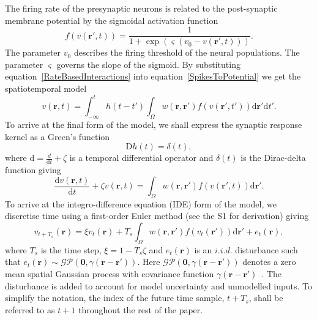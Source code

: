 \documentclass[12pt]{iopart}
\begin{document}
The firing rate of the presynaptic neurons is related to the post-synaptic membrane potential by the sigmoidal activation function 
\begin{equation}
	\label{ActivationFunction} f\left( v\left( \mathbf{r}', t \right) \right) = \frac{1}{1 + \exp \left( \varsigma \left( v_0 - v\left(\mathbf{r}',t\right) \right) \right)}. 
\end{equation}
The parameter $v_0$ describes the  firing threshold of the neural populations. The parameter $\varsigma$ governs the slope of the sigmoid. By substituting equation~\ref{RateBasedInteractions} into equation~\ref{SpikesToPotential} we get the spatiotemporal model 
\begin{equation}
	\label{FullDoubleIntModel} v\left(\mathbf{r},t\right) =
	\int_{-\infty}^t 
	h\left(t - t'\right) \int_\Omega
	w\left(\mathbf{r},\mathbf{r}'\right) 
	f\left( v\left( \mathbf{r}',t' \right)\right)
	\textrm{d}\mathbf{r}'\textrm{d}t'.
\end{equation}
To arrive at the final form of the model, we shall express the synaptic response kernel as a Green's function 
\begin{equation}
	\label{GreensFuncDef} \textrm{D}h\left( t \right) = \delta \left( t \right), 
\end{equation}
where $\textrm{d}=\frac{d}{\textrm{d}t} + \zeta$ is a temporal differential operator and $\delta(t)$ is the Dirac-delta function giving 
\begin{equation}
	\label{FinalFormContinuous} 
	\frac{\textrm{d}v\left( \mathbf{r},t \right)}{\textrm{d}t} + \zeta v\left( \mathbf{r},t \right) = \int_\Omega {w\left( \mathbf{r},\mathbf{r}' \right)f\left( {v\left( \mathbf{r}',t \right)} \right)\textrm{d}\mathbf{r}'}. 
\end{equation}
To arrive at the integro-difference equation (IDE) form of the model, we discretise time using a first-order Euler method (see the S1 for derivation) giving 
\begin{equation}
	\label{DiscreteTimeModel} 
	v_{t+T_s}\left(\mathbf{r}\right) = 
	\xi v_t\left(\mathbf{r}\right) + 
	T_s \int_\Omega { 
	    w\left(\mathbf{r},\mathbf{r}'\right)
	    f\left(v_t\left(\mathbf{r}'\right)\right) 
	\textrm{d}\mathbf{r}'} 
	+ e_t\left(\mathbf{r}\right), 
\end{equation}
where $T_s$ is the time step, $\xi = 1-T_s\zeta $ and $e_t(\mathbf{r})$ is an $i.i.d.$ disturbance such that $e_t(\mathbf{r})\sim\mathcal{GP}(\mathbf 0,\gamma(\mathbf{r}-\mathbf{r}'))$. Here $\mathcal{GP}(\mathbf 0,\gamma(\mathbf{r}-\mathbf{r}'))$ denotes a zero mean spatial Gaussian process with covariance function $\gamma(\mathbf{r}-\mathbf{r}')$~\cite{Rasmussen2005}. The disturbance is added to account for model uncertainty and unmodelled inputs. To simplify the notation, the index of the future time sample, $t+T_s$, shall be referred to as $t+1$ throughout the rest of the paper. 
\end{document}
